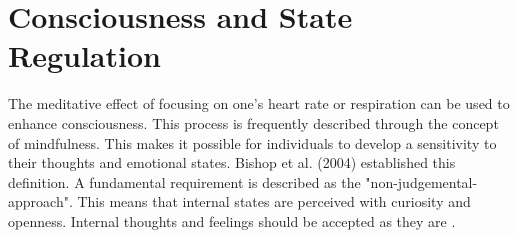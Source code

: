 \section{Consciousness and State Regulation}

The meditative effect of focusing on one's heart rate or respiration can be used to enhance consciousness. This process is frequently described through the concept of mindfulness. This makes it possible for individuals to develop a sensitivity to their thoughts and emotional states. Bishop et al. (2004) established this definition. A fundamental requirement is described as the "non-judgemental-approach". This means that internal states are perceived with curiosity and openness. Internal thoughts and feelings should be accepted as they are \cite{bishop2004mindfulness}.
